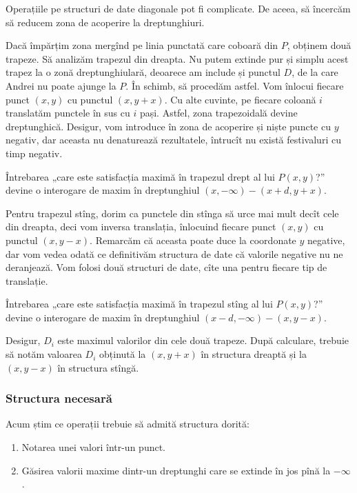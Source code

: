 \documentclass[../main.tex]{subfiles}
\begin{document}
Operațiile pe structuri de date diagonale pot fi complicate. De aceea, să încercăm să reducem zona de acoperire la dreptunghiuri.

Dacă împărțim zona mergînd pe linia punctată care coboară din $P$, obținem două trapeze. Să analizăm trapezul din dreapta. Nu putem extinde pur și simplu acest trapez la o zonă dreptunghiulară, deoarece am include și punctul $D$, de la care Andrei nu poate ajunge la $P$. În schimb, să procedăm astfel. Vom înlocui fiecare punct $(x, y)$ cu punctul $(x, y + x)$. Cu alte cuvinte, pe fiecare coloană $i$ translatăm punctele în sus cu $i$ pași. Astfel, zona trapezoidală devine dreptunghică. Desigur, vom introduce în zona de acoperire și niște puncte cu $y$ negativ, dar aceasta nu denaturează rezultatele, întrucît nu există festivaluri cu timp negativ.

Întrebarea „care este satisfacția maximă în trapezul drept al lui $P(x, y)$?” devine o interogare de maxim în dreptunghiul $(x, -\infty) - (x + d, y + x)$.

Pentru trapezul stîng, dorim ca punctele din stînga să urce mai mult decît cele din dreapta, deci vom inversa translația, înlocuind fiecare punct $(x, y)$ cu punctul $(x, y - x)$. Remarcăm că aceasta poate duce la coordonate $y$ negative, dar vom vedea odată ce definitivăm structura de date că valorile negative nu ne deranjează. Vom folosi două structuri de date, cîte una pentru fiecare tip de translație.

Întrebarea „care este satisfacția maximă în trapezul stîng al lui $P(x, y)$?” devine o interogare de maxim în dreptunghiul $(x - d, -\infty) - (x, y - x)$.

Desigur, $D_i$ este maximul valorilor din cele două trapeze. După calculare, trebuie să notăm valoarea $D_i$ obținută la $(x, y + x)$ în structura dreaptă și la $(x, y - x)$ în structura stîngă.

\subsubsection*{Structura necesară}

Acum știm ce operații trebuie să admită structura dorită:

\begin{enumerate}
  \item Notarea unei valori într-un punct.
  \item Găsirea valorii maxime dintr-un dreptunghi care se extinde în jos pînă la $-\infty$.
\end{enumerate}
\end{document}
